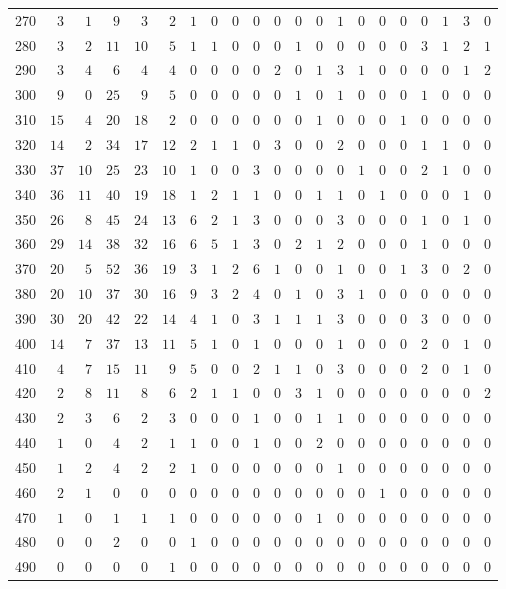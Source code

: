 \begin{sidewaystable}[!tbp]
\begin{center}
\begin{tabular}{lrrrrrrrrrrrrrrrrrrrr}
270&$ 3$&$ 1$&$ 9$&$ 3$&$ 2$&$1$&$0$&$0$&$0$&$0$&$0$&$0$&$1$&$0$&$0$&$0$&$0$&$1$&$ 3$&$0$\tabularnewline
280&$ 3$&$ 2$&$11$&$10$&$ 5$&$1$&$1$&$0$&$0$&$0$&$1$&$0$&$0$&$0$&$0$&$0$&$3$&$1$&$ 2$&$1$\tabularnewline
290&$ 3$&$ 4$&$ 6$&$ 4$&$ 4$&$0$&$0$&$0$&$0$&$2$&$0$&$1$&$3$&$1$&$0$&$0$&$0$&$0$&$ 1$&$2$\tabularnewline
300&$ 9$&$ 0$&$25$&$ 9$&$ 5$&$0$&$0$&$0$&$0$&$0$&$1$&$0$&$1$&$0$&$0$&$0$&$1$&$0$&$ 0$&$0$\tabularnewline
310&$15$&$ 4$&$20$&$18$&$ 2$&$0$&$0$&$0$&$0$&$0$&$0$&$1$&$0$&$0$&$0$&$1$&$0$&$0$&$ 0$&$0$\tabularnewline
320&$14$&$ 2$&$34$&$17$&$12$&$2$&$1$&$1$&$0$&$3$&$0$&$0$&$2$&$0$&$0$&$0$&$1$&$1$&$ 0$&$0$\tabularnewline
330&$37$&$10$&$25$&$23$&$10$&$1$&$0$&$0$&$3$&$0$&$0$&$0$&$0$&$1$&$0$&$0$&$2$&$1$&$ 0$&$0$\tabularnewline
340&$36$&$11$&$40$&$19$&$18$&$1$&$2$&$1$&$1$&$0$&$0$&$1$&$1$&$0$&$1$&$0$&$0$&$0$&$ 1$&$0$\tabularnewline
350&$26$&$ 8$&$45$&$24$&$13$&$6$&$2$&$1$&$3$&$0$&$0$&$0$&$3$&$0$&$0$&$0$&$1$&$0$&$ 1$&$0$\tabularnewline
360&$29$&$14$&$38$&$32$&$16$&$6$&$5$&$1$&$3$&$0$&$2$&$1$&$2$&$0$&$0$&$0$&$1$&$0$&$ 0$&$0$\tabularnewline
370&$20$&$ 5$&$52$&$36$&$19$&$3$&$1$&$2$&$6$&$1$&$0$&$0$&$1$&$0$&$0$&$1$&$3$&$0$&$ 2$&$0$\tabularnewline
380&$20$&$10$&$37$&$30$&$16$&$9$&$3$&$2$&$4$&$0$&$1$&$0$&$3$&$1$&$0$&$0$&$0$&$0$&$ 0$&$0$\tabularnewline
390&$30$&$20$&$42$&$22$&$14$&$4$&$1$&$0$&$3$&$1$&$1$&$1$&$3$&$0$&$0$&$0$&$3$&$0$&$ 0$&$0$\tabularnewline
400&$14$&$ 7$&$37$&$13$&$11$&$5$&$1$&$0$&$1$&$0$&$0$&$0$&$1$&$0$&$0$&$0$&$2$&$0$&$ 1$&$0$\tabularnewline
410&$ 4$&$ 7$&$15$&$11$&$ 9$&$5$&$0$&$0$&$2$&$1$&$1$&$0$&$3$&$0$&$0$&$0$&$2$&$0$&$ 1$&$0$\tabularnewline
420&$ 2$&$ 8$&$11$&$ 8$&$ 6$&$2$&$1$&$1$&$0$&$0$&$3$&$1$&$0$&$0$&$0$&$0$&$0$&$0$&$ 0$&$2$\tabularnewline
430&$ 2$&$ 3$&$ 6$&$ 2$&$ 3$&$0$&$0$&$0$&$1$&$0$&$0$&$1$&$1$&$0$&$0$&$0$&$0$&$0$&$ 0$&$0$\tabularnewline
440&$ 1$&$ 0$&$ 4$&$ 2$&$ 1$&$1$&$0$&$0$&$1$&$0$&$0$&$2$&$0$&$0$&$0$&$0$&$0$&$0$&$ 0$&$0$\tabularnewline
450&$ 1$&$ 2$&$ 4$&$ 2$&$ 2$&$1$&$0$&$0$&$0$&$0$&$0$&$0$&$1$&$0$&$0$&$0$&$0$&$0$&$ 0$&$0$\tabularnewline
460&$ 2$&$ 1$&$ 0$&$ 0$&$ 0$&$0$&$0$&$0$&$0$&$0$&$0$&$0$&$0$&$0$&$1$&$0$&$0$&$0$&$ 0$&$0$\tabularnewline
470&$ 1$&$ 0$&$ 1$&$ 1$&$ 1$&$0$&$0$&$0$&$0$&$0$&$0$&$1$&$0$&$0$&$0$&$0$&$0$&$0$&$ 0$&$0$\tabularnewline
480&$ 0$&$ 0$&$ 2$&$ 0$&$ 0$&$1$&$0$&$0$&$0$&$0$&$0$&$0$&$0$&$0$&$0$&$0$&$0$&$0$&$ 0$&$0$\tabularnewline
490&$ 0$&$ 0$&$ 0$&$ 0$&$ 1$&$0$&$0$&$0$&$0$&$0$&$0$&$0$&$0$&$0$&$0$&$0$&$0$&$0$&$ 0$&$0$\tabularnewline
\hline
\end{tabular}
\end{center}
\end{sidewaystable}

